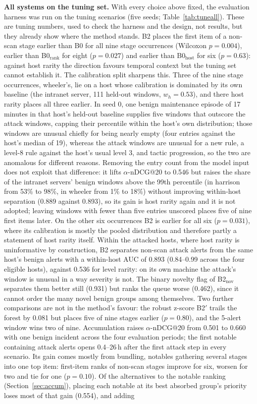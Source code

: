 \documentclass[conference]{IEEEtran}
\begin{document}
\textbf{All systems on the tuning set.} With every choice above fixed, the evaluation harness was run on the tuning scenarios (five seeds; Table~\ref{tab:tuneall}). These are tuning numbers, used to check the harness and the design, not results, but they already show where the method stands. B2 places the first item of a non-scan stage earlier than B0 for all nine stage occurrences (Wilcoxon $p = 0.004$), earlier than B0$_\mathrm{rank}$ for eight ($p = 0.027$) and earlier than B0$_\mathrm{host}$ for six ($p = 0.63$): against host rarity the direction favours temporal context but the tuning set cannot establish it. The calibration split sharpens this. Three of the nine stage occurrences, wheeler's, lie on a host whose calibration is dominated by its own baseline (the intranet server, 111 held-out windows, $w_h = 0.53$), and there host rarity places all three earlier. In seed 0, one benign maintenance episode of 17 minutes in that host's held-out baseline supplies five windows that outscore the attack windows, capping their percentile within the host's own distribution; those windows are unusual chiefly for being nearly empty (four entries against the host's median of 19), whereas the attack windows are unusual for a new rule, a level-8 rule against the host's usual level 3, and tactic progression, so the two are anomalous for different reasons. Removing the entry count from the model input does not exploit that difference: it lifts $\alpha$-nDCG@20 to 0.546 but raises the share of the intranet servers' benign windows above the 99th percentile (in harrison from 53\% to 98\%, in wheeler from 1\% to 18\%) without improving within-host separation (0.889 against 0.893), so its gain is host rarity again and it is not adopted; leaving windows with fewer than five entries unscored places five of nine first items later. On the other six occurrences B2 is earlier for all six ($p = 0.031$), where its calibration is mostly the pooled distribution and therefore partly a statement of host rarity itself. Within the attacked hosts, where host rarity is uninformative by construction, B2 separates non-scan attack alerts from the same host's benign alerts with a within-host AUC of 0.893 (0.84--0.99 across the four eligible hosts), against 0.536 for level rarity: on its own machine the attack's window is unusual in a way severity is not. The binary novelty flag of B2$_\mathrm{nov}$ separates them better still (0.931) but ranks the queue worse (0.462), since it cannot order the many novel benign groups among themselves. Two further comparisons are not in the method's favour: the robust z-score B2$'$ trails the forest by 0.081 but places five of nine stages earlier ($p = 0.80$), and the 5-alert window wins two of nine. Accumulation raises $\alpha$-nDCG@20 from 0.501 to 0.660 with one benign incident across the four evaluation periods; the first notable containing attack alerts opens 0.4--26\,h after the first attack step in every scenario. Its gain comes mostly from bundling, notables gathering several stages into one top item: first-item ranks of non-scan stages improve for six, worsen for two and tie for one ($p = 0.10$). Of the alternatives to the notable ranking (Section~\ref{sec:accum}), placing each notable at its best absorbed group's priority loses most of that gain (0.554), and adding 
\end{document}
